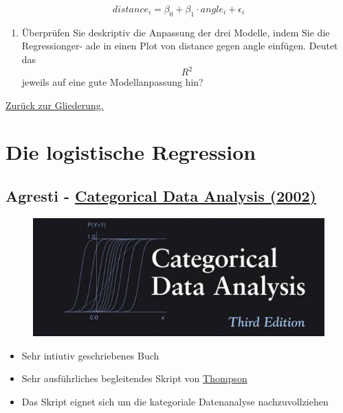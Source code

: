 \documentclass[]{article}
\providecommand{\tightlist}{%
  \setlength{\itemsep}{0pt}\setlength{\parskip}{0pt}}
\begin{document}
\[ distance_i= \beta_0 + \beta_1 \cdot angle_i + \epsilon_i\]

\begin{enumerate}
\def\labelenumi{(\alph{enumi})}
\setcounter{enumi}{3}
\tightlist
\item
  Überprüfen Sie deskriptiv die Anpassung der drei Modelle, indem Sie
  die Regressionger- ade in einen Plot von distance gegen angle
  einfügen. Deutet das \[ R^2 \] jeweils auf eine gute Modellanpassung
  hin?
\end{enumerate}

\href{https://github.com/Japhilko/IntroR/blob/master/2016/README.md}{Zurück
zur Gliederung.}

\section{Die logistische Regression}\label{die-logistische-regression}

\subsection{\texorpdfstring{Agresti -
\href{https://mathdept.iut.ac.ir/sites/mathdept.iut.ac.ir/files/AGRESTI.PDF}{Categorical
Data Analysis
(2002)}}{Agresti - Categorical Data Analysis (2002)}}\label{agresti---categorical-data-analysis-2002}

\begin{figure}[htbp]
\centering
\includegraphics{figure/CDAagresti.PNG}
\caption{}
\end{figure}

\begin{itemize}
\tightlist
\item
  Sehr intiutiv geschriebenes Buch
\item
  Sehr ausführliches begleitendes Skript von
  \href{http://statweb.stanford.edu/~owen/courses/306a/Splusdiscrete2.pdf}{Thompson}
\item
  Das Skript eignet sich um die kategoriale Datenanalyse
  nachzuvollziehen
\end{itemize}
\end{document}
